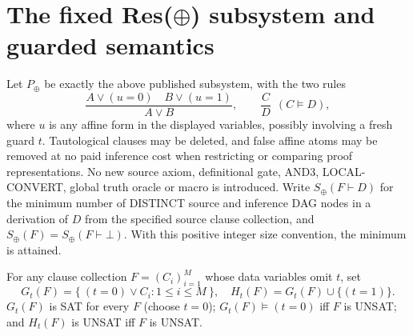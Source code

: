 \documentclass[11pt]{article}
\begin{document}
\section*{The fixed Res($\oplus$) subsystem and guarded semantics}
Let $P_\oplus$ be exactly the above published subsystem, with the two rules
\[
\frac{A\vee(u=0)\quad B\vee(u=1)}{A\vee B},
\qquad \frac{C}{D}\ \ (C\models D),
\]
where $u$ is any affine form in the displayed variables, possibly involving a fresh guard $t$. Tautological clauses may be deleted, and false affine atoms may be removed at no paid inference cost when restricting or comparing proof representations. No new source axiom, definitional gate, AND3, LOCAL-CONVERT, global truth oracle or macro is introduced. Write $S_\oplus(F\vdash D)$ for the minimum number of DISTINCT source and inference DAG nodes in a derivation of $D$ from the specified source clause collection, and $S_\oplus(F)=S_\oplus(F\vdash\bot)$. With this positive integer size convention, the minimum is attained.

For any clause collection $F=(C_i)_{i=1}^M$ whose data variables omit $t$, set
\[
G_t(F)=\{\ (t=0)\vee C_i:1\le i\le M\ \},\quad
H_t(F)=G_t(F)\cup\{(t=1)\}.
\]
$G_t(F)$ is SAT for every $F$ (choose $t=0$); $G_t(F)\models(t=0)$ iff $F$ is UNSAT; and $H_t(F)$ is UNSAT iff $F$ is UNSAT.
\end{document}
